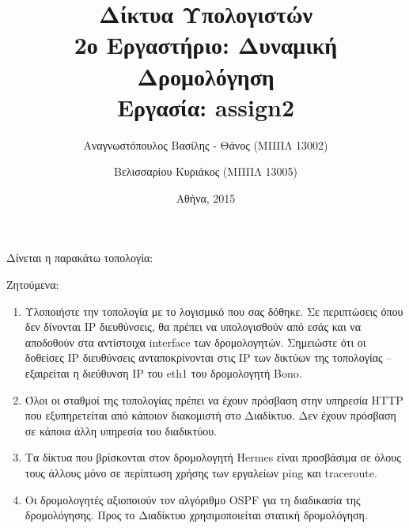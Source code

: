 \documentclass{assignment}
\title{Δίκτυα Υπολογιστών \\ 2ο Εργαστήριο: Δυναμική Δρομολόγηση \\ Εργασία: assign2}
\date{Αθήνα, 2015}
\author{Αναγνωστόπουλος Βασίλης - Θάνος (ΜΠΠΛ 13002) \and Βελισσαρίου Κυριάκος (ΜΠΠΛ 13005)}
\begin{document}
\maketitle

\setcounter{page}{1} 

\pagestyle{plain}
\tableofcontents
\newpage

\setcounter{page}{1} 


Δίνεται η παρακάτω τοπολογία:

\begin{center}
\end{center}

Ζητούμενα:

\begin{enumerate}

\item Υλοποιήστε την τοπολογία με το λογισμικό που σας δόθηκε. Σε περιπτώσεις όπου δεν δίνονται IP διευθύνσεις, θα πρέπει να υπολογισθούν από εσάς και να αποδοθούν στα αντίστοιχα interface των δρομολογητών. Σημειώστε ότι οι δοθείσες IP διευθύνσεις ανταποκρίνονται στις IP των δικτύων της τοπολογίας – εξαιρείται η διεύθυνση IP του eth1 του δρομολογητή Bono. 

\item Όλοι οι σταθμοί της τοπολογίας πρέπει να έχουν πρόσβαση στην υπηρεσία HTTP που εξυπηρετείται από κάποιον διακομιστή στο Διαδίκτυο. Δεν έχουν πρόσβαση σε κάποια άλλη υπηρεσία του διαδικτύου.

\item Τα δίκτυα που βρίσκονται στον δρομολογητή Hermes είναι προσβάσιμα σε όλους τους άλλους μόνο σε περίπτωση χρήσης των εργαλείων ping και traceroute.

\item Οι δρομολογητές αξιοποιούν τον αλγόριθμο OSPF για τη διαδικασία της δρομολόγησης. 
Προς το Διαδίκτυο χρησιμοποιείται στατική δρομολόγηση.

\end{enumerate}
 
\end{document}
